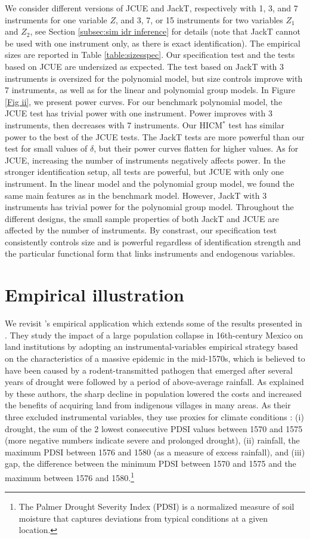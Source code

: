 \documentclass[12pt]{article}
\newcommand{\1}{\mathbf{1}}
\begin{document}
We consider different versions of JCUE and JackT, respectively with 1, 3, and 7 instruments
for one variable $Z$, and 3, 7, or 15 instruments for two
variables $Z_1$ and $Z_2$, see Section \ref{subsec:sim idr
inference} for details (note that JackT cannot be used with one
instrument only, as there is exact identification).
The empirical sizes are reported in Table
\ref{table:sizesspec}. Our specification test and the tests
based on JCUE are undersized as expected.  The test based on JackT
with 3 instruments is oversized for the polynomial model, but size
controls improve with 7 instruments, as well as for the linear and
polynomial group models.  In Figure \ref{Fig ii}, we present power
curves. For our benchmark polynomial model, the JCUE test has trivial
power with one instrument. Power improves with 3 instruments, then
decreases with 7 instruments. Our HICM$^*$ test has similar power to
the best of the JCUE tests.  The JackT tests are more powerful than
our test for small values of $\delta$, but their power curves flatten
for higher values. As for JCUE, increasing the number of instruments
negatively affects power. In the stronger identification setup, all
tests are powerful, but JCUE with only one instrument.  In the linear
model and the polynomial group model, we found the same main features
as in the benchmark model. However, JackT with 3 instruments has
trivial power for the polynomial group model.  Throughout the
different designs, the small sample properties of both JackT and JCUE
are affected by the number of instruments. By constrast, our
specification test consistently controls size and is powerful
regardless of identification strength and the particular functional
form that links instruments and endogenous variables.


\section{Empirical illustration}
\label{sec.ea}

We revisit \cite{antoine_identification-robust_2023}'s empirical
application which extends some of the results presented in
\cite{Mexico}. They study the impact of a large population collapse in
16th-century Mexico on land institutions by adopting an
instrumental-variables empirical strategy based on the characteristics
of a massive epidemic in the mid-1570s, which is believed to have been
caused by a rodent-transmitted pathogen that emerged after several
years of drought were followed by a period of above-average rainfall.
As explained by these authors, the sharp decline in population lowered
the costs and increased the benefits of acquiring land from indigenous
villages in many areas. As their three excluded instrumental
variables, they use proxies for climate conditions : (i) drought, the
sum of the 2 lowest consecutive PDSI values between 1570 and 1575
(more negative numbers indicate severe and prolonged drought), (ii)
rainfall, the maximum PDSI between 1576 and 1580 (as a measure of
excess rainfall), and (iii) gap, the difference between the minimum
PDSI between 1570 and 1575 and the maximum between 1576 and
1580.\footnote{The Palmer Drought Severity Index (PDSI) is a
normalized measure of soil moisture that captures deviations from
typical conditions at a given location.}
\end{document}
